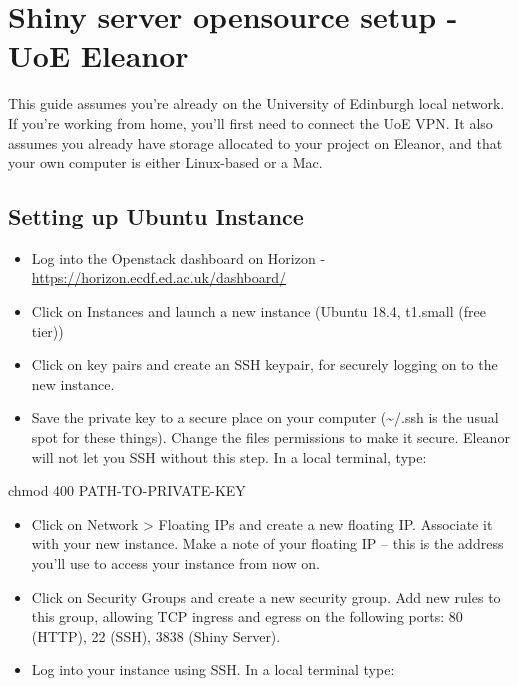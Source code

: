 \documentclass[
]{book}
\newenvironment{Shaded}{\begin{snugshade}}{\end{snugshade}}
\newcommand{\FunctionTok}[1]{\textcolor[rgb]{0.00,0.00,0.00}{#1}}
\newcommand{\NormalTok}[1]{#1}
\providecommand{\tightlist}{%
  \setlength{\itemsep}{0pt}\setlength{\parskip}{0pt}}
\begin{document}
\hypertarget{shiny-server-opensource-setup---uoe-eleanor}{%
\section{Shiny server opensource setup - UoE Eleanor}\label{shiny-server-opensource-setup---uoe-eleanor}}

This guide assumes you're already on the University of Edinburgh local network. If you're working from home, you'll first need to connect the UoE VPN. It also assumes you already have storage allocated to your project on Eleanor, and that your own computer is either Linux-based or a Mac.

\hypertarget{setting-up-ubuntu-instance}{%
\subsection{Setting up Ubuntu Instance}\label{setting-up-ubuntu-instance}}

\begin{itemize}
\tightlist
\item
  Log into the Openstack dashboard on Horizon - \url{https://horizon.ecdf.ed.ac.uk/dashboard/}
\item
  Click on Instances and launch a new instance (Ubuntu 18.4, t1.small (free tier))
\item
  Click on key pairs and create an SSH keypair, for securely logging on to the new instance.
\item
  Save the private key to a secure place on your computer (\textasciitilde/.ssh is the usual spot for these things). Change the files permissions to make it secure. Eleanor will not let you SSH without this step. In a local terminal, type:
\end{itemize}

\begin{Shaded}
\begin{Highlighting}[]
\FunctionTok{chmod}\NormalTok{ 400 PATH-TO-PRIVATE-KEY}
\end{Highlighting}
\end{Shaded}

\begin{itemize}
\tightlist
\item
  Click on Network \textgreater{} Floating IPs and create a new floating IP. Associate it with your new instance. Make a note of your floating IP -- this is the address you'll use to access your instance from now on.
\item
  Click on Security Groups and create a new security group. Add new rules to this group, allowing TCP ingress and egress on the following ports: 80 (HTTP), 22 (SSH), 3838 (Shiny Server).
\item
  Log into your instance using SSH. In a local terminal type:
\end{itemize}
\end{document}
